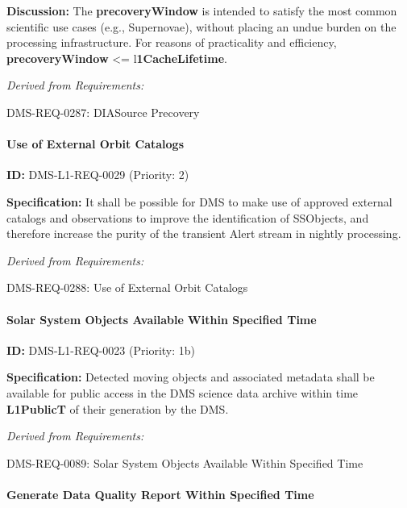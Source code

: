 \documentclass[SE,toc,lsstdraft]{lsstdoc}
\begin{document}
\textbf{Discussion: }The \textbf{precoveryWindow }is intended to satisfy the most common scientific use cases (e.g., Supernovae), without placing an undue burden on the processing infrastructure.  For reasons of practicality and efficiency, \textbf{precoveryWindow }<= l\textbf{1CacheLifetime}.

\emph{Derived from Requirements:}

DMS-REQ-0287:
DIASource Precovery \newline

\paragraph{Use of External Orbit Catalogs}\hfill  %

\label{DMS-L1-REQ-0029}
\textbf{ID:} DMS-L1-REQ-0029 (Priority: 2)

\textbf{Specification:} It shall be possible for DMS to make use of approved external catalogs and observations to improve the identification of SSObjects, and therefore increase the purity of the transient Alert stream in nightly processing.

\emph{Derived from Requirements:}

DMS-REQ-0288:
Use of External Orbit Catalogs \newline

\paragraph{Solar System Objects Available Within Specified Time}\hfill  %

\label{DMS-L1-REQ-0023}
\textbf{ID:} DMS-L1-REQ-0023 (Priority: 1b)

\textbf{Specification:} Detected moving objects and associated metadata shall be available for public access in the DMS science data archive within time \textbf{L1PublicT }of their generation by the DMS.

\emph{Derived from Requirements:}

DMS-REQ-0089:
Solar System Objects Available Within Specified Time \newline

\paragraph{Generate Data Quality Report Within Specified Time}\hfill  %
\end{document}
